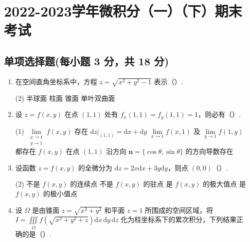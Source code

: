 \documentclass[../main.tex]{subfiles}
\begin{document}
\chapter{2022-2023学年微积分（一）（下）期末考试}

\section{单项选择题(每小题 3 分，共 18 分)}
\begin{enumerate}
  \item 在空间直角坐标系中，方程 \( z = \sqrt{x^2 + y^2 - 1} \) 表示（\qquad）.

        \begin{tasks}[label=\textbf{\Alph*.}, label-width=1.5em, column-sep=1em](2)
          \task 半球面
          \task 柱面
          \task 锥面
          \task 单叶双曲面
        \end{tasks}

  \item 设 \( z = f(x, y) \) 在点 \( (1,1) \) 处有 \( f_x(1,1) = f_y(1,1) = 1 \)，则必有（\qquad）.

        \begin{tasks}[label=\textbf{\Alph*.}, label-width=1.5em, column-sep=1em](1)
          \task \( \lim\limits_{\substack{x \to 1 \\ y \to 1}} f(x, y) \) 存在
          \task \( \mathrm{d}z|_{(1,1)} = \mathrm{d}x + \mathrm{d}y \)
          \task \( \lim\limits_{x \to 1} f(x, 1) \) 及 \( \lim\limits_{y \to 1} f(1, y) \) 都存在
          \task \( f(x, y) \) 在点 \( (1,1) \) 沿方向 \( \boldsymbol{n} = \{\cos\theta, \sin\theta\} \) 的方向导数存在
        \end{tasks}

  \item 设函数 \( z = f(x, y) \) 的全微分为 \( \mathrm{d}z = 2x \mathrm{d}x + 3y \mathrm{d}y \)，则点 \( (0,0) \)（\qquad）.

        \begin{tasks}[label=\textbf{\Alph*.}, label-width=1.5em, column-sep=1em](2)
          \task 不是 \( f(x, y) \) 的连续点
          \task 不是 \( f(x, y) \) 的驻点
          \task 是 \( f(x, y) \) 的极大值点
          \task 是 \( f(x, y) \) 的极小值点
        \end{tasks}

  \item 设 \( \Omega \) 是由锥面 \( z = \sqrt{x^2 + y^2} \) 和平面 \( z = 1 \) 所围成的空间区域，将 \( I = \displaystyle \iiint \limits_{\Omega} f(\sqrt{x^2 + y^2 + z}) \mathrm{d}x\,\mathrm{d}y\,\mathrm{d}z \) 化为柱坐标系下的累次积分，下列结果正确的是（\qquad）.


\end{enumerate}
\end{document}
